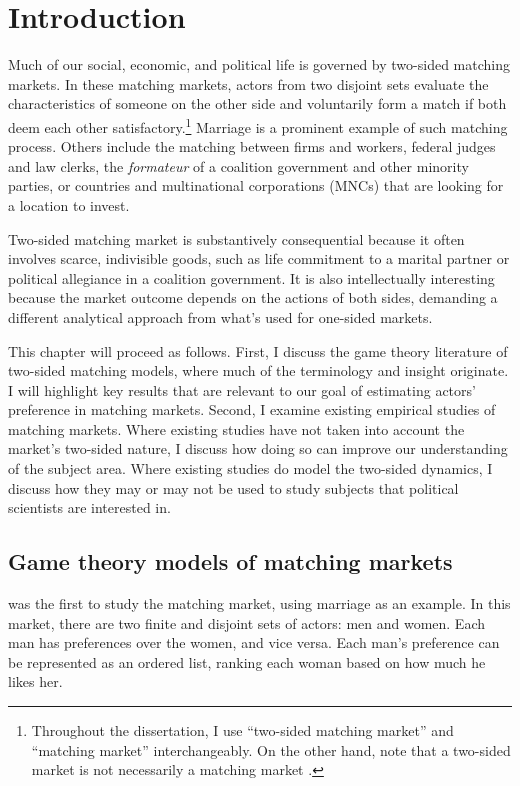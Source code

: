\chapter{Introduction}

Much of our social, economic, and political life is governed by two-sided
matching markets. In these matching markets, actors from two disjoint sets
evaluate the characteristics of someone on the other side and voluntarily form a
match if both deem each other satisfactory.\footnote{Throughout the
  dissertation, I use ``two-sided matching market'' and ``matching market''
  interchangeably. On the other hand, note that a two-sided market is not
  necessarily a matching market \citep{Rysman2009}.} Marriage is a prominent
example of such matching process. Others include the matching between firms and
workers, federal judges and law clerks, the \textit{formateur} of a coalition
government and other minority parties, or countries and multinational
corporations (MNCs) that are looking for a location to invest.

Two-sided matching market is substantively consequential because it often
involves scarce, indivisible goods, such as life commitment to a marital partner
or political allegiance in a coalition government. It is also intellectually
interesting because the market outcome depends on the actions of both sides,
demanding a different analytical approach from what's used for one-sided
markets.

This chapter will proceed as follows. First, I discuss the game theory
literature of two-sided matching models, where much of the terminology and
insight originate. I will highlight key results that are relevant to our goal of
estimating actors' preference in matching markets. Second, I examine existing
empirical studies of matching markets. Where existing studies have not taken
into account the market's two-sided nature, I discuss how doing so can improve
our understanding of the subject area. Where existing studies do model the
two-sided dynamics, I discuss how they may or may not be used to study subjects
that political scientists are interested in.

\section{Game theory models of matching markets}
\label{sec:game_theory}

\citet{Gale1962} was the first to study the matching market, using marriage as
an example. In this market, there are two finite and disjoint sets of actors:
men and women. Each man has preferences over the women, and vice versa. Each
man's preference can be represented as an ordered list, ranking each woman based
on how much he likes her.

